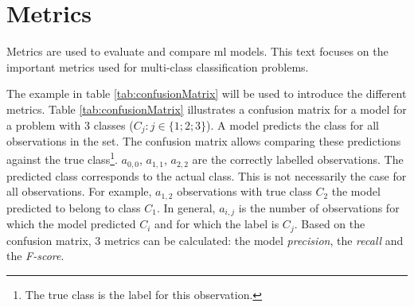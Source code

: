 \section{Metrics}
\par{Metrics are used to evaluate and compare \acrlong{ml} models.
This text focuses on the important metrics used for multi-class classification problems.
}
\par{
    The example in table \ref{tab:confusionMatrix} will be used to introduce the different metrics.
    Table \ref{tab:confusionMatrix} illustrates a confusion matrix for a model for a problem with 3 classes ($C_j:j\in \{1;2;3\}$). 
    A model predicts the class for all observations in the set.
    The confusion matrix allows comparing these predictions against the true class\footnote{The true class is the label for this observation.}.
    $a_{0,0}$, $a_{1,1}$, $a_{2,2}$ are the correctly labelled observations. 
The predicted class corresponds to the actual class.
This is not necessarily the case for all observations. For example, $a_{1,2}$ observations with true class $C_2$ the model predicted to belong to class $C_1$.
In general, $a_{i,j}$ is the number of observations for which the model predicted $C_i$ and for which the label is $C_j$.
Based on the confusion matrix, 3 metrics can be calculated: the model \textit{precision}, the \textit{recall} and the \textit{F-score}.
}

